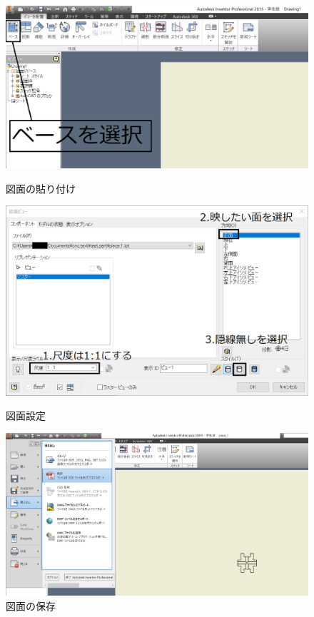 \documentclass[b5paper, 9pt, twocolumn, titlepage,openany]{jsbook}%
\begin{document}
\begin{onecolumn}
\begin{figure}[tbh]
  \begin{center}
    \begin{minipage}{0.8\columnwidth}
      \includegraphics[width=\columnwidth]{no_jis_trim.png}
    \end{minipage}
    \caption{図面の貼り付け    \label{cutting_image}}
    \begin{minipage}{0.8\columnwidth}
      \includegraphics[width=\columnwidth]{window2.png}
    \end{minipage}
    \caption{図面設定    \label{window}}
    \begin{minipage}{0.8\columnwidth}
      \includegraphics[width=\columnwidth]{hozon2_trim.png}
    \end{minipage}
    \caption{図面の保存    \label{pdf_save}}
  \end{center}
\end{figure}
\end{onecolumn}
\end{document}
